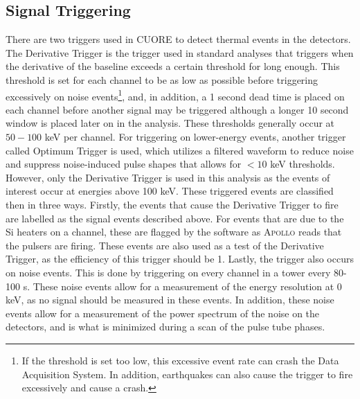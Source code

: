 \subsection*{Signal Triggering}
There are two triggers used in CUORE to detect thermal events in the detectors.
The Derivative Trigger is the trigger used in standard analyses that triggers when the derivative of the baseline exceeds a certain threshold for long enough.
This threshold is set for each channel to be as low as possible before triggering excessively on noise events\footnote{If the threshold is set too low, this excessive event rate can crash the Data Acquisition System.
In addition, earthquakes can also cause the trigger to fire excessively and cause a crash.}, and, in addition, a 1 second dead time is placed on each channel before another signal may be triggered although a longer 10 second window is placed later on in the analysis.
These thresholds generally occur at $50-100$ keV per channel.
For triggering on lower-energy events, another trigger called Optimum Trigger is used, which utilizes a filtered waveform to reduce noise and suppress noise-induced pulse shapes that allows for $<10$ keV thresholds.
However, only the Derivative Trigger is used in this analysis as the events of interest occur at energies above 100 keV. 
These triggered events are classified then in three ways.
Firstly, the events that cause the Derivative Trigger to fire are labelled as the signal events described above.
For events that are due to the Si heaters on a channel, these are flagged by the software as \textsc{Apollo} reads that the pulsers are firing.
These events are also used as a test of the Derivative Trigger, as the efficiency of this trigger should be 1.
Lastly, the trigger also occurs on noise events.
This is done by triggering on every channel in a tower every 80-100 s.
These noise events allow for a measurement of the energy resolution at 0 keV, as no signal should be measured in these events.
In addition, these noise events allow for a measurement of the power spectrum of the noise on the detectors, and is what is minimized during a scan of the pulse tube phases.


